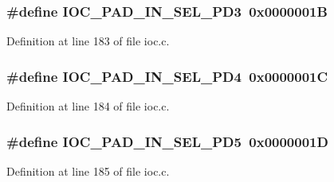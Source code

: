 \subsubsection[{\texorpdfstring{I\+O\+C\+\_\+\+P\+A\+D\+\_\+\+I\+N\+\_\+\+S\+E\+L\+\_\+\+P\+D3}{IOC_PAD_IN_SEL_PD3}}]{\setlength{\rightskip}{0pt plus 5cm}\#define I\+O\+C\+\_\+\+P\+A\+D\+\_\+\+I\+N\+\_\+\+S\+E\+L\+\_\+\+P\+D3~0x0000001B}\hypertarget{group__ioc__api_ga5d322d895531779a9441399d7070d742}{}\label{group__ioc__api_ga5d322d895531779a9441399d7070d742}


Definition at line 183 of file ioc.\+c.

\subsubsection[{\texorpdfstring{I\+O\+C\+\_\+\+P\+A\+D\+\_\+\+I\+N\+\_\+\+S\+E\+L\+\_\+\+P\+D4}{IOC_PAD_IN_SEL_PD4}}]{\setlength{\rightskip}{0pt plus 5cm}\#define I\+O\+C\+\_\+\+P\+A\+D\+\_\+\+I\+N\+\_\+\+S\+E\+L\+\_\+\+P\+D4~0x0000001C}\hypertarget{group__ioc__api_ga4ae06f728718c475b8424e597fe0e0f3}{}\label{group__ioc__api_ga4ae06f728718c475b8424e597fe0e0f3}


Definition at line 184 of file ioc.\+c.

\subsubsection[{\texorpdfstring{I\+O\+C\+\_\+\+P\+A\+D\+\_\+\+I\+N\+\_\+\+S\+E\+L\+\_\+\+P\+D5}{IOC_PAD_IN_SEL_PD5}}]{\setlength{\rightskip}{0pt plus 5cm}\#define I\+O\+C\+\_\+\+P\+A\+D\+\_\+\+I\+N\+\_\+\+S\+E\+L\+\_\+\+P\+D5~0x0000001D}\hypertarget{group__ioc__api_ga1f824940fc882be2cd2cffc664a92ab6}{}\label{group__ioc__api_ga1f824940fc882be2cd2cffc664a92ab6}


Definition at line 185 of file ioc.\+c.

